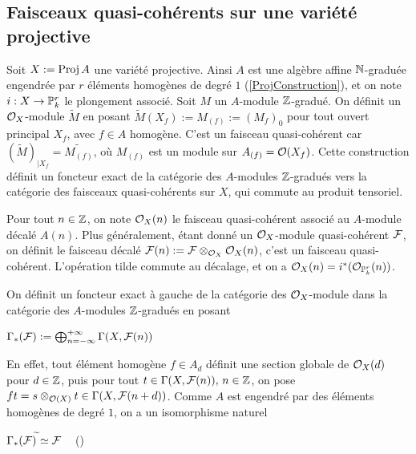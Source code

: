 \subsection{Faisceaux quasi-cohérents sur une variété projective}

\label{FQCProj}

Soit $X:=\operatorname{Proj} A$ une variété projective. Ainsi $A$ est une algèbre affine $\mathbb{N}$-graduée engendrée par $r$ éléments homogènes de degré $1$ (\ref{ProjConstruction}), et on note $i:X\rightarrow \mathbb{P}_k^r$ le plongement associé. Soit $M$ un $A$-module $\mathbb{Z}$-gradué. On définit un $\mathcal{O}_X$-module $\widetilde{M}$ en posant $\widetilde{M}(X_f):=M_{(f)}:=(M_f)_0$ pour tout ouvert principal $X_f$, avec $f\in A$ homogène. C'est un faisceau quasi-cohérent car $(\widetilde{M})_{|X_f}=\widetilde{M_{(f)}}$, où $M_{(f)}$ est un module sur $A_{(f)}=\mathcal{O}(X_f)$. Cette construction définit un foncteur exact de la catégorie des $A$-modules $\mathbb{Z}$-gradués vers la catégorie des faisceaux quasi-cohérents sur $X$, qui commute au produit tensoriel.

Pour tout $n\in \mathbb{Z}$, on note $\mathcal{O}_X(n)$ le faisceau quasi-cohérent associé au $A$-module décalé $A(n)$. Plus généralement, étant donné un $\mathcal{O}_X$-module quasi-cohérent $\mathcal{F}$, on définit le faisceau décalé $\mathcal{F}(n):=\mathcal{F}\otimes_{\mathcal{O}_X}\mathcal{O}_X(n)$, c'est un faisceau quasi-cohérent. L'opération tilde commute au décalage, et on a $\mathcal{O}_X(n)=i^*(\mathcal{O}_{\mathbb{P}_k^r}(n))$.

On définit un foncteur exact à gauche de la catégorie des $\mathcal{O}_X$-module dans la catégorie des $A$-modules $\mathbb{Z}$-gradués en posant 
\begin{center}
$\Gamma_*(\mathcal{F}):=\bigoplus_{n=-\infty}^{+\infty}\Gamma(X,\mathcal{F}(n))$
\end{center}
En effet, tout élément homogène $f\in A_d$ définit une section globale de $\mathcal{O}_X(d)$ pour $d\in \mathbb{Z}$, puis pour tout $t\in \Gamma(X,\mathcal{F}(n)),\, n\in\mathbb{Z}$, on pose $ft=s\otimes_{\mathcal{O}(X)} t\in \Gamma(X, \mathcal{F}(n+d))$. Comme $A$ est engendré par des éléments homogènes de degré $1$, on a un isomorphisme naturel 
\begin{center}
$\Gamma_*(\mathcal{F})^{\widetilde{}}\simeq \mathcal{F}\,\,\,\,\,$ (\cite[II.5.15]{Hartshorne})\end{center}

